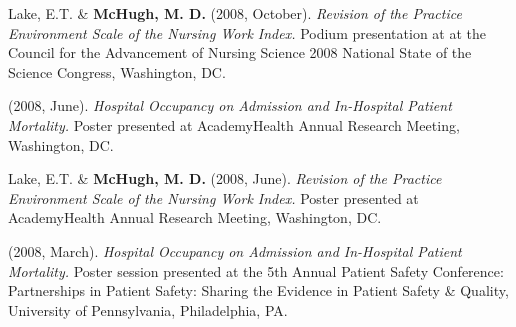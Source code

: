 \documentclass[10pt,]{article}
\begin{document}
{{{{{{{{{{{{{{{\begin{hangparas}{.25in}{1}
\end{hangparas}



\begin{hangparas}{.25in}{1}

\*Lake, E.T. \& {\textbf {McHugh, M. D.}} (2008, October). {\textit {Revision of the Practice Environment Scale of the Nursing Work Index.}} Podium presentation at at the Council for the Advancement of Nursing Science 2008 National State of the Science Congress, Washington, DC.

\end{hangparas}



\begin{hangparas}{.25in}{1}

 (2008, June). {\textit {Hospital Occupancy on Admission and In-Hospital Patient Mortality.}} Poster presented at AcademyHealth Annual Research Meeting, Washington, DC.

\end{hangparas}



\begin{hangparas}{.25in}{1}

\*Lake, E.T. \& {\textbf {McHugh, M. D.}} (2008, June). {\textit {Revision of the Practice Environment Scale of the Nursing Work Index.}} Poster presented at AcademyHealth Annual Research Meeting, Washington, DC.

\end{hangparas}



\begin{hangparas}{.25in}{1}

 (2008, March). {\textit {Hospital Occupancy on Admission and In-Hospital Patient Mortality.}} Poster session presented at the 5th Annual Patient Safety Conference: Partnerships in Patient Safety: Sharing the Evidence in Patient Safety \& Quality, University of Pennsylvania, Philadelphia, PA.

\end{hangparas}

\vspace{4mm}

\section{\Large {}}

}}}}}}}}}}}}}}}
\end{document}

